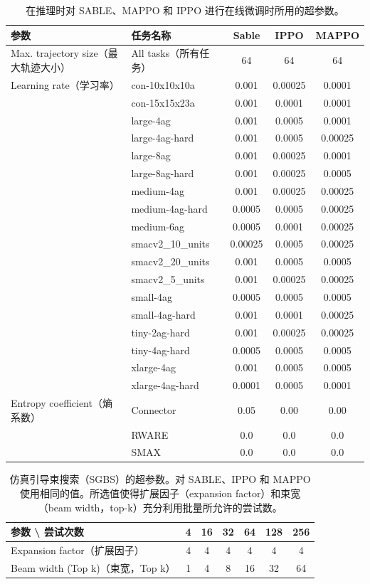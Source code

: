 \documentclass[11pt,UTF8,fontset=fandol]{ctexart}
\begin{document}
\begin{table}[H]\centering
\caption{在推理时对 SABLE、MAPPO 和 IPPO 进行在线微调时所用的超参数。}
\label{tab:4}
\small
\begin{tabular}{llccc}
\toprule
参数 & 任务名称 & Sable & IPPO & MAPPO\\
\midrule
Max. trajectory size（最大轨迹大小） & All tasks（所有任务） & 64 & 64 & 64\\
\midrule
Learning rate（学习率） & con-10x10x10a & 0.001 & 0.00025 & 0.0001\\
 & con-15x15x23a & 0.001 & 0.0001 & 0.0001\\
 & large-4ag & 0.001 & 0.0005 & 0.0001\\
 & large-4ag-hard & 0.001 & 0.0005 & 0.00025\\
 & large-8ag & 0.001 & 0.00025 & 0.0001\\
 & large-8ag-hard & 0.001 & 0.00025 & 0.0005\\
 & medium-4ag & 0.001 & 0.00025 & 0.00025\\
 & medium-4ag-hard & 0.0005 & 0.0005 & 0.00025\\
 & medium-6ag & 0.0005 & 0.0001 & 0.00025\\
 & smacv2\_10\_units & 0.00025 & 0.0005 & 0.00025\\
 & smacv2\_20\_units & 0.001 & 0.0005 & 0.0005\\
 & smacv2\_5\_units & 0.001 & 0.00025 & 0.00025\\
 & small-4ag & 0.0005 & 0.0005 & 0.0005\\
 & small-4ag-hard & 0.001 & 0.0001 & 0.00025\\
 & tiny-2ag-hard & 0.001 & 0.00025 & 0.00025\\
 & tiny-4ag-hard & 0.0005 & 0.0005 & 0.0005\\
 & xlarge-4ag & 0.001 & 0.0005 & 0.0005\\
 & xlarge-4ag-hard & 0.0001 & 0.0005 & 0.0001\\
\midrule
Entropy coefficient（熵系数） & Connector & 0.05 & 0.00 & 0.00\\
 & RWARE & 0.0 & 0.0 & 0.0\\
 & SMAX & 0.0 & 0.0 & 0.0\\
\bottomrule
\end{tabular}
\end{table}

\begin{table}[H]\centering
\caption{仿真引导束搜索（SGBS）的超参数。对 SABLE、IPPO 和 MAPPO 使用相同的值。所选值使得扩展因子（expansion factor）和束宽（beam width，top-k）充分利用批量所允许的尝试数。}
\label{tab:5}
\begin{tabular}{lcccccc}
\toprule
参数 \textbackslash{} 尝试次数 & 4 & 16 & 32 & 64 & 128 & 256\\
\midrule
Expansion factor（扩展因子） & 4 & 4 & 4 & 4 & 4 & 4\\
Beam width (Top k)（束宽，Top k） & 1 & 4 & 8 & 16 & 32 & 64\\
\bottomrule
\end{tabular}
\end{table}
\end{document}
